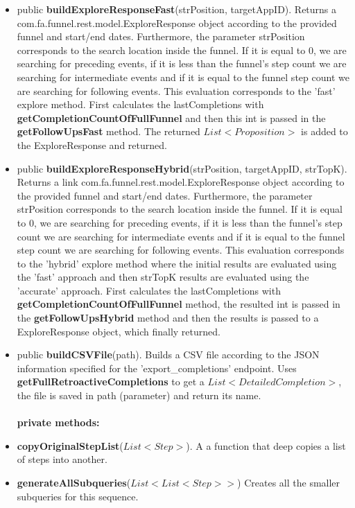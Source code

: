 \documentclass{article}
\begin{document}
\begin{itemize}
\begin{itemize}
	\item public \textbf{buildExploreResponseFast}(strPosition, targetAppID). Returns a  com.fa.funnel.rest.model.ExploreResponse object according to the provided funnel and start/end dates. Furthermore, the parameter strPosition corresponds to the search location inside the funnel. If it is equal to 0, we are searching for preceding events, if it is less than the funnel's step count we are searching for intermediate events and if it is equal to the funnel step count we are searching for following events. This evaluation corresponds to the 'fast' explore method. First calculates the lastCompletions with \textbf{getCompletionCountOfFullFunnel} and then this int is passed in the \textbf{getFollowUpsFast} method. The returned $List<Proposition>$ is added to the ExploreResponse and returned.
	\item public \textbf{buildExploreResponseHybrid}(strPosition, targetAppID, strTopK). Returns a link com.fa.funnel.rest.model.ExploreResponse object according to the provided funnel and start/end dates. Furthermore, the parameter strPosition corresponds to the search location inside the funnel. If it is equal to 0, we are searching for preceding events, if it is less than the funnel's step count we are searching for intermediate events and if it is equal to the funnel step count we are searching for following events. This evaluation corresponds to the 'hybrid' explore method where the initial results are evaluated using the 'fast' approach and then strTopK results are evaluated using the 'accurate' approach. First calculates the lastCompletions with \textbf{getCompletionCountOfFullFunnel} method, the resulted int  is passed in the \textbf{getFollowUpsHybrid} method and then the results is passed to a ExploreResponse object, which finally returned.
	\item public \textbf{buildCSVFile}(path). Builds a CSV file according to the JSON information specified for the 'export\_completions' endpoint. Uses \textbf{getFullRetroactiveCompletions} to get a $List<DetailedCompletion>$, the file is saved in path (parameter) and return its name.\\ \\
	\textbf{private methods:}\\
	\item \textbf{copyOriginalStepList}($List<Step>$). A a function that deep copies a list of steps into another.
	\item \textbf{generateAllSubqueries}($List<List<Step>>$) Creates all the smaller subqueries for this sequence.

\end{itemize}
\end{itemize}
\end{document}
